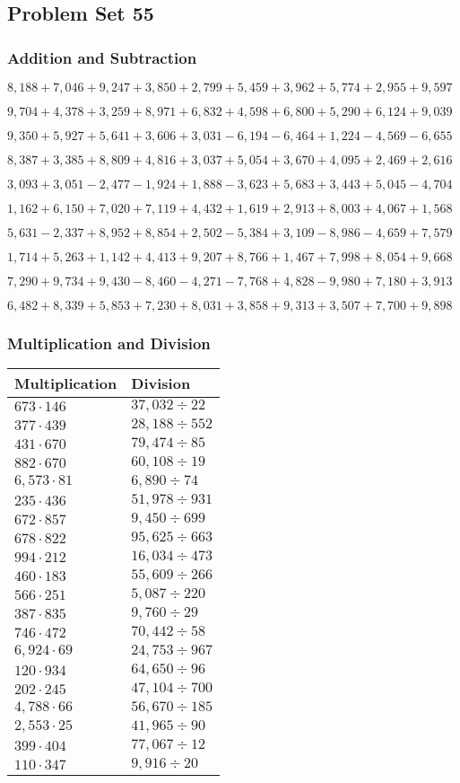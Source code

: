 \hypertarget{problem-set-55-2}{%
\subsection{Problem Set 55}\label{problem-set-55-2}}

\hypertarget{addition-and-subtraction-217}{%
\subsubsection{Addition and
Subtraction}\label{addition-and-subtraction-217}}

\(8,188+7,046+9,247+3,850+2,799+5,459+3,962+5,774+2,955+ 9,597\)

\(9,704+4,378+3,259+8,971+6,832+4,598+6,800+5,290+6,124+9,039\)

\(9,350+5,927+5,641+3,606+3,031-6,194-6,464+1,224-4,569-6,655\)

\(8,387+3,385+8,809+4,816+3,037+5,054+3,670+4,095+2,469+2,616\)

\(3,093+3,051-2,477-1,924+1,888-3,623+5,683+3,443+5,045-4,704\)

\(1,162+6,150+7,020+7,119+4,432+1,619+2,913+8,003+4,067+1,568\)

\(5,631-2,337+8,952+8,854+2,502-5,384+3,109-8,986-4,659+7,579\)

\(1,714+5,263+1,142+4,413+9,207+8,766+1,467+7,998+8,054+9,668\)

\(7,290+9,734+9,430-8,460-4,271-7,768+4,828-9,980+7,180+3,913\)

\(6,482+8,339+5,853+7,230+8,031+3,858+9,313+3,507+7,700+9,898\)

\hypertarget{multiplication-and-division-216}{%
\subsubsection{Multiplication and
Division}\label{multiplication-and-division-216}}

\begin{longtable}[]{@{}ll@{}}
\toprule
Multiplication & Division\tabularnewline
\midrule
\endhead
\(673\cdot146\) & \(37,032÷22\)\tabularnewline
\(377\cdot439\) & \(28,188÷552\)\tabularnewline
\(431\cdot670\) & \(79,474÷85\)\tabularnewline
\(882\cdot670\) & \(60,108÷19\)\tabularnewline
\(6,573\cdot81\) & \(6,890÷74\)\tabularnewline
\(235\cdot436\) & \(51,978÷931\)\tabularnewline
\(672\cdot857\) & \(9,450÷699\)\tabularnewline
\(678\cdot822\) & \(95,625÷663\)\tabularnewline
\(994\cdot212\) & \(16,034÷473\)\tabularnewline
\(460\cdot183\) & \(55,609÷266\)\tabularnewline
\(566\cdot251\) & \(5,087÷220\)\tabularnewline
\(387\cdot835\) & \(9,760÷29\)\tabularnewline
\(746\cdot472\) & \(70,442÷58\)\tabularnewline
\(6,924\cdot69\) & \(24,753÷967\)\tabularnewline
\(120\cdot934\) & \(64,650÷96\)\tabularnewline
\(202\cdot245\) & \(47,104÷700\)\tabularnewline
\(4,788\cdot66\) & \(56,670÷185\)\tabularnewline
\(2,553\cdot25\) & \(41,965÷90\)\tabularnewline
\(399\cdot404\) & \(77,067÷12\)\tabularnewline
\(110\cdot347\) & \(9,916÷20\)\tabularnewline
\bottomrule
\end{longtable}

